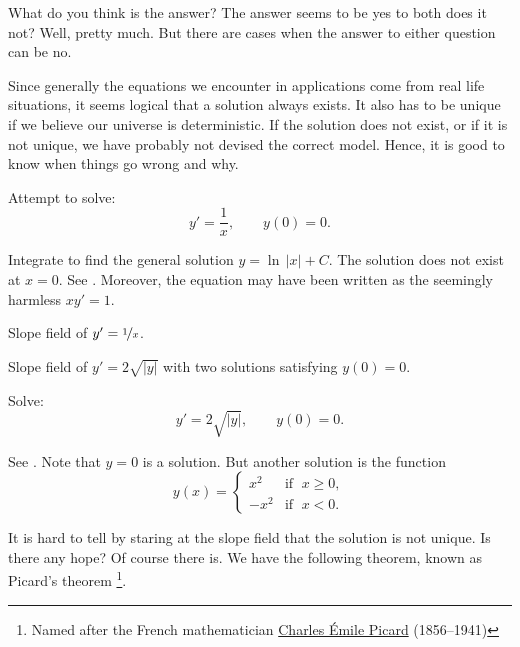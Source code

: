 What do you think is the answer?
The answer seems to be yes to both does it not?  Well, pretty much.  But there
are cases when the answer to either question can be no.

Since generally the equations we encounter in applications
come from real life situations, it seems
logical that a solution always exists.
It also has to be unique if we believe our
universe is deterministic.  If the solution does not exist, or if it is
not unique, we have
probably not devised the correct model.  Hence, it is good to know
when things go wrong and why.

\begin{example}
Attempt to solve:
\begin{equation*}
y' = \frac{1}{x}, \qquad y(0) = 0 .
\end{equation*}

Integrate to find the general solution $y = \ln \, \lvert x \rvert + C$.  The
solution does not exist at $x=0$.  See .
Moreover,
the equation may have been written as the seemingly harmless $x y' = 1$.

\begin{myfig}
\parbox[t]{3in}{
 \capstart
 \caption{Slope field of $y' = \nicefrac{1}{x}$.\label{1.3:xinvfig}}
}
\quad
\parbox[t]{3in}{
 \capstart
 \caption{Slope field of $y' = 2 \sqrt{\lvert y \rvert}$ with two
 solutions satisfying $y(0) = 0$.\label{1.3:sqrtfig}}
}
\end{myfig}
\end{example}

\begin{example}
Solve:
\begin{equation*}
y' = 2 \sqrt{\lvert y \rvert}, \qquad y(0) = 0 .
\end{equation*}

See .
Note that $y=0$ is a solution.  But another solution is the function
\begin{equation*}
y(x) =
\begin{cases}
x^2 & \text{if } \; x \geq 0,\\
-x^2 & \text{if } \; x < 0.
\end{cases}
\end{equation*}
\end{example}

It is hard to tell by staring at the slope field that the
solution is not
unique.
Is there any hope?
Of course there is.  We have the following theorem,
known as Picard's theorem%
\footnote{Named after the French mathematician
\href{https://en.wikipedia.org/wiki/Charles_\%C3\%89mile_Picard}{Charles \'Emile Picard}
(1856--1941)}. 


